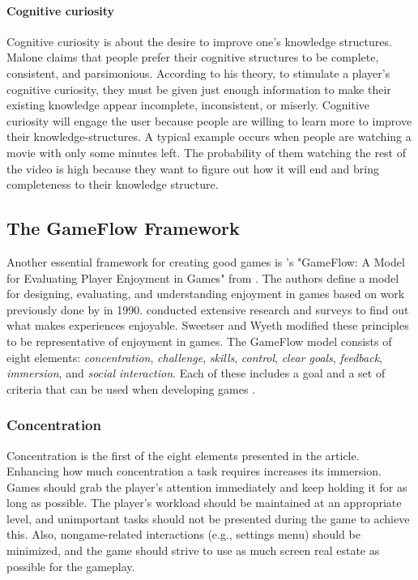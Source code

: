 \paragraph*{Cognitive curiosity}
Cognitive curiosity is about the desire to improve one’s knowledge structures. Malone claims that people prefer their cognitive structures to be complete, consistent, and parsimonious. According to his theory, to stimulate a player’s cognitive curiosity, they must be given just enough information to make their existing knowledge appear incomplete, inconsistent, or miserly. Cognitive curiosity will engage the user because people are willing to learn more to improve their knowledge-structures. A typical example occurs when people are watching a movie with only some minutes left. The probability of them watching the rest of the video is high because they want to figure out how it will end and bring completeness to their knowledge structure.

\subsection{The GameFlow Framework}
Another essential framework for creating good games is \citeauthor{sweetser_gameflow_2005}’s "GameFlow: A Model for Evaluating Player Enjoyment in Games" from \citeyear{sweetser_gameflow_2005}. The authors define a model for designing, evaluating, and understanding enjoyment in games based on work previously done by \citeauthor{csikszentmihalyi_flow_1990} in 1990. \citeauthor{csikszentmihalyi_flow_1990} conducted extensive research and surveys to find out what makes experiences enjoyable. Sweetser and Wyeth modified these principles to be representative of enjoyment in games. The GameFlow model consists of eight elements: \textit{concentration}, \textit{challenge}, \textit{skills}, \textit{control}, \textit{clear goals}, \textit{feedback}, \textit{immersion}, and \textit{social interaction}. Each of these includes a goal and a set of criteria that can be used when developing games \citep{sweetser_gameflow_2005}.

\subsubsection{Concentration}
Concentration is the first of the eight elements presented in the article. Enhancing how much concentration a task requires increases its immersion. Games should grab the player’s attention immediately and keep holding it for as long as possible. The player’s workload should be maintained at an appropriate level, and unimportant tasks should not be presented during the game to achieve this. Also, nongame-related interactions (e.g., settings menu) should be minimized, and the game should strive to use as much screen real estate  as possible for the gameplay. 

